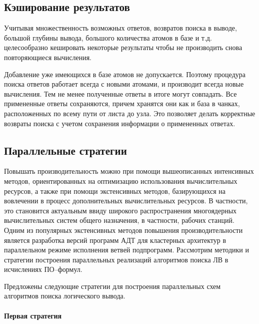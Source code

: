 \subsection{Кэширование результатов}
Учитывая множественность возможных ответов, возвратов поиска в выводе, большой глубины вывода, большого количества атомов в базе и т.д. целесообразно кешировать некоторые результаты чтобы не производить снова повторяющиеся вычисления.

Добавление уже имеющихся в базе атомов не допускается. Поэтому процедура поиска ответов работает всегда с новыми атомами, и производит всегда новые вычисления. Тем не менее полученные ответы в итоге могут совпадать. Все примененные ответы сохраняются, причем хранятся они как и база в чанках, расположенных по всему пути от листа до узла. Это позволяет делать корректные возвраты поиска с учетом сохранения информации о примененных ответах.


\subsection{Параллельные стратегии}

Повышать производительность можно при помощи вышеописанных интенсивных методов, ориентированных на оптимизацию использования вычислительных ресурсов, а также при помощи экстенсивных методов, базирующихся на вовлечении в процесс дополнительных вычислительных ресурсов. В частности, это становится актуальным ввиду широкого распространения многоядерных вычислительных систем общего назначения, в частности, рабочих станций. Одним из популярных экстенсивных методов повышения производительности является разработка версий программ АДТ для кластерных архитектур в параллельном режиме исполнения ветвей подпрограмм. Рассмотрим методики и стратегии построения параллельных реализаций алгоритмов поиска ЛВ в исчислениях ПО--формул.

Предложены следующие стратегии для построения параллельных схем алгоритмов поиска логического вывода.

\paragraph{Первая стратегия}

